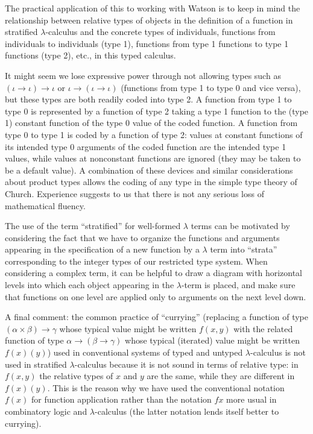 \documentclass{kluwer}
\begin{document}
\begin{article}
The practical application of this to working with Watson is to keep in
mind the relationship between relative types of objects in the
definition of a function in stratified $\lambda$-calculus and the
concrete types of individuals, functions from individuals to
individuals (type 1), functions from type 1 functions to type 1
functions (type 2), etc., in this typed calculus.

It might seem we lose expressive power through not allowing types such
as $(\iota \rightarrow \iota) \rightarrow \iota$ or $\iota \rightarrow
(\iota \rightarrow \iota)$ (functions from type 1 to type 0 and vice
versa), but these types are both readily coded into type 2.  A
function from type 1 to type 0 is represented by a function of type 2
taking a type 1 function to the (type 1) constant function of the type
0 value of the coded function.  A function from type 0 to type 1 is
coded by a function of type 2: values at constant functions of its
intended type 0 arguments of the coded function are the intended type
1 values, while values at nonconstant functions are ignored (they may
be taken to be a default value).  A combination of these devices and
similar considerations about product types allows the coding of any
type in the simple type theory of Church.  Experience suggests to us
that there is not any serious loss of mathematical fluency.

The use of the term ``stratified'' for well-formed $\lambda$ terms can
be motivated by considering the fact that we have to organize the
functions and arguments appearing in the specification of a new
function by a $\lambda$ term into ``strata'' corresponding to the
integer types of our restricted type system.  When considering a
complex term, it can be helpful to draw a diagram with horizontal
levels into which each object appearing in the $\lambda$-term is
placed, and make sure that functions on one level are applied only to
arguments on the next level down.

A final comment: the common practice of ``currying'' (replacing a
function of type $(\alpha \times \beta) \rightarrow \gamma$ whose
typical value might be written $f(x,y)$ with the related function of
type $\alpha \rightarrow (\beta \rightarrow \gamma)$ whose typical
(iterated) value might be written $f(x)(y)$) used in conventional
systems of typed and untyped $\lambda$-calculus is not used in
stratified $\lambda$-calculus because it is not sound in terms of
relative type: in $f(x,y)$ the relative types of $x$ and $y$ are the
same, while they are different in $f(x)(y)$.  This is the reason why
we have used the conventional notation $f(x)$ for function application
rather than the notation $fx$ more usual in combinatory logic and
$\lambda$-calculus (the latter notation lends itself better to
currying).


\end{article}
\end{document}
